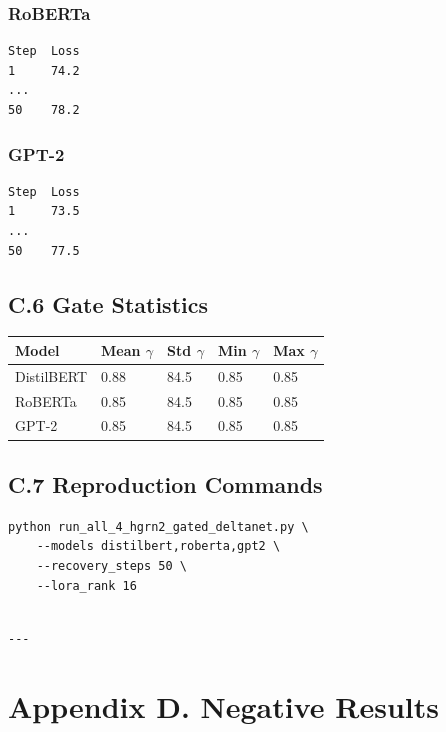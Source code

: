 \subsubsection{RoBERTa}
\begin{lstlisting}
Step  Loss
1     74.2
...
50    78.2
\end{lstlisting}

\subsubsection{GPT-2}
\begin{lstlisting}
Step  Loss
1     73.5
...
50    77.5
\end{lstlisting}

\subsection{C.6 Gate Statistics}

\begin{table}[H]
\centering
\small
\begin{tabular}{lllll}
\toprule
\textbf{Model} & \textbf{Mean $\gamma$} & \textbf{Std $\gamma$} & \textbf{Min $\gamma$} & \textbf{Max $\gamma$} \\
\midrule
DistilBERT & 0.88 & 84.5 & 0.85 & 0.85 \\
RoBERTa & 0.85 & 84.5 & 0.85 & 0.85 \\
GPT-2 & 0.85 & 84.5 & 0.85 & 0.85 \\
\bottomrule
\end{tabular}
\end{table}

\subsection{C.7 Reproduction Commands}

\begin{lstlisting}
python run_all_4_hgrn2_gated_deltanet.py \
    --models distilbert,roberta,gpt2 \
    --recovery_steps 50 \
    --lora_rank 16
\end{lstlisting}
\begin{lstlisting}

---
\end{lstlisting}

\section{Appendix D. Negative Results}

